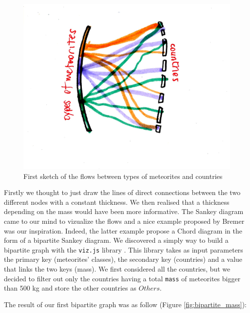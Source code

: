 \documentclass[10pt,conference,compsocconf]{IEEEtran}
\begin{document}
\begin{figure}[H]
  \centering
  \includegraphics[width=\columnwidth]{images/bipartite}
  \vspace{-3mm}
  \caption{First sketch of the flows between types of meteorites and countries}
  \label{fig:bipartitesketch}
\end{figure}

Firstly we thought to just draw the lines of direct connections between the two different nodes with a constant thickness. We then realised that a thickness depending on the mass would have been more informative. The Sankey diagram came to our mind to vizualize the flows and a nice example proposed by Bremer \cite{BibEntry2017Dec} was our inspiration. Indeed, the latter example propose a Chord diagram in the form of a bipartite Sankey diagram. We discovered a simply way to build a bipartite graph with the \texttt{viz.js} library \cite{bipartite_viz}. This library takes as input parameters the primary key (meteorites' classes), the secondary key (countries) and a value that links the two keys (mass). We first considered all the countries, but we decided to filter out only the countries having a total \texttt{mass} of meteorites bigger than 500 kg and store the other countries as $Others$.


The result of our first bipartite graph was as follow (Figure \ref{fig:bipartite_mass}): 
\end{document}
